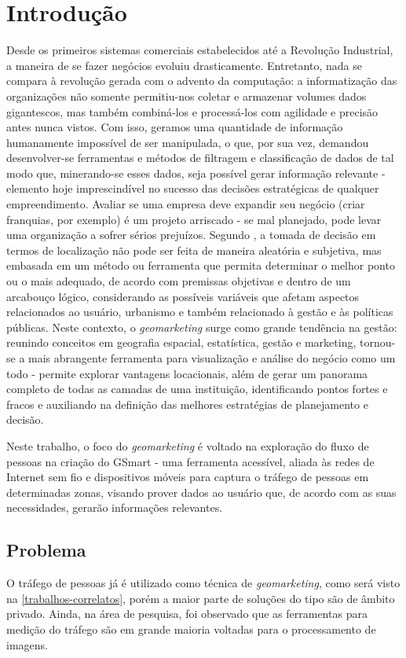 
\chapter{Introdução}
\label{introducao}

Desde os primeiros sistemas comerciais estabelecidos até a Revolução Industrial,
a maneira de se fazer negócios evoluiu drasticamente. Entretanto, nada se
compara à revolução gerada com o advento da computação: a informatização das
organizações não somente permitiu-nos coletar e armazenar volumes dados
gigantescos, mas também combiná-los e processá-los com agilidade e precisão antes nunca
vistos. Com isso, geramos uma quantidade de informação humanamente impossível de
ser manipulada, o que, por sua vez, demandou desenvolver-se ferramentas e
métodos de filtragem e classificação de dados de tal modo que, minerando-se esses dados, seja possível gerar
informação relevante - elemento hoje imprescindível no sucesso
das decisões estratégicas de qualquer empreendimento. Avaliar se uma empresa
deve expandir seu negócio (criar franquias, por exemplo) é um projeto
arriscado - se mal planejado, pode levar uma organização a sofrer sérios
prejuízos. Segundo , a tomada de decisão em termos de
localização não pode ser feita de maneira aleatória e subjetiva, mas embasada em
um método ou ferramenta que permita determinar o melhor ponto ou o mais
adequado, de acordo com premissas objetivas e dentro de um arcabouço lógico,
considerando as possíveis variáveis que afetam aspectos relacionados ao usuário,
urbanismo e também relacionado à gestão e às políticas públicas. Neste contexto, o \emph{geomarketing} surge como grande tendência na gestão: reunindo conceitos em geografia espacial, estatística, gestão e marketing, tornou-se a mais abrangente ferramenta para visualização e análise do negócio como um todo - permite explorar vantagens locacionais, além de gerar um panorama completo de todas as camadas de uma instituição, identificando pontos fortes e fracos e auxiliando na definição das melhores estratégias de planejamento e decisão. 

Neste trabalho, o foco do \emph{geomarketing} é voltado na exploração do fluxo de pessoas na criação do GSmart - uma ferramenta acessível, aliada às redes de Internet sem fio e dispositivos móveis para captura o tráfego de pessoas em determinadas zonas, visando prover dados ao usuário que, de acordo com as suas necessidades, gerarão informações relevantes. 

\section{Problema}
O tráfego de pessoas já é utilizado como técnica de \emph{geomarketing}, como será visto na \autoref{trabalhos-correlatos}, porém
a maior parte de soluções do tipo são de âmbito privado. Ainda, na área de pesquisa, foi observado que as ferramentas para medição do tráfego
são em grande maioria voltadas para o processamento de imagens.

